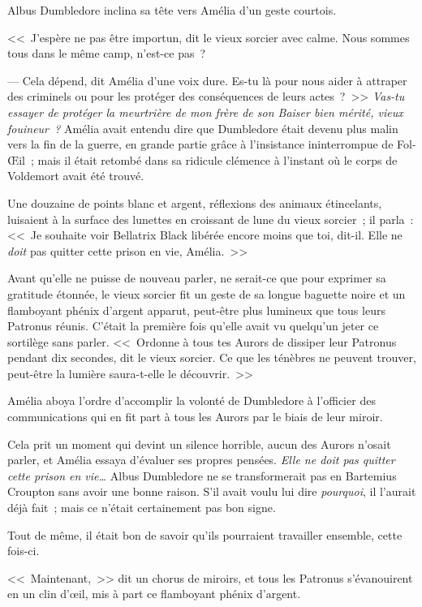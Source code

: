 Albus Dumbledore inclina sa tête vers Amélia d'un geste courtois.

<<~J'espère ne pas être importun, dit le vieux sorcier avec calme. Nous sommes tous dans le même camp, n'est-ce pas~?

--- Cela dépend, dit Amélia d'une voix dure. Es-tu là pour nous aider à attraper des criminels ou pour les protéger des conséquences de leurs actes~?~>> \emph{Vas-tu essayer de protéger la meurtrière de mon frère de son Baiser bien mérité, vieux fouineur~?} Amélia avait entendu dire que Dumbledore était devenu plus malin vers la fin de la guerre, en grande partie grâce à l'insistance ininterrompue de Fol-Œil~; mais il était retombé dans sa ridicule clémence à l'instant où le corps de Voldemort avait été trouvé.

Une douzaine de points blanc et argent, réflexions des animaux étincelants, luisaient à la surface des lunettes en croissant de lune du vieux sorcier~; il parla~: <<~Je souhaite voir Bellatrix Black libérée encore moins que toi, dit-il. Elle ne \emph{doit} pas quitter cette prison en vie, Amélia.~>>

Avant qu'elle ne puisse de nouveau parler, ne serait-ce que pour exprimer sa gratitude étonnée, le vieux sorcier fit un geste de sa longue baguette noire et un flamboyant phénix d'argent apparut, peut-être plus lumineux que tous leurs Patronus réunis. C'était la première fois qu'elle avait vu quelqu'un jeter ce sortilège sans parler. <<~Ordonne à tous tes Aurors de dissiper leur Patronus pendant dix secondes, dit le vieux sorcier. Ce que les ténèbres ne peuvent trouver, peut-être la lumière saura-t-elle le découvrir.~>>

Amélia aboya l'ordre d'accomplir la volonté de Dumbledore à l'officier des communications qui en fit part à tous les Aurors par le biais de leur miroir.

Cela prit un moment qui devint un silence horrible, aucun des Aurors n'osait parler, et Amélia essaya d'évaluer ses propres pensées. \emph{Elle ne doit pas quitter cette prison en vie…} Albus Dumbledore ne se transformerait pas en Bartemius Croupton sans avoir une bonne raison. S'il avait voulu lui dire \emph{pourquoi}, il l'aurait déjà fait~; mais ce n'était certainement pas bon signe.

Tout de même, il était bon de savoir qu'ils pourraient travailler ensemble, cette fois-ci.

<<~Maintenant,~>> dit un chorus de miroirs, et tous les Patronus s'évanouirent en un clin d'œil, mis à part ce flamboyant phénix d'argent.

